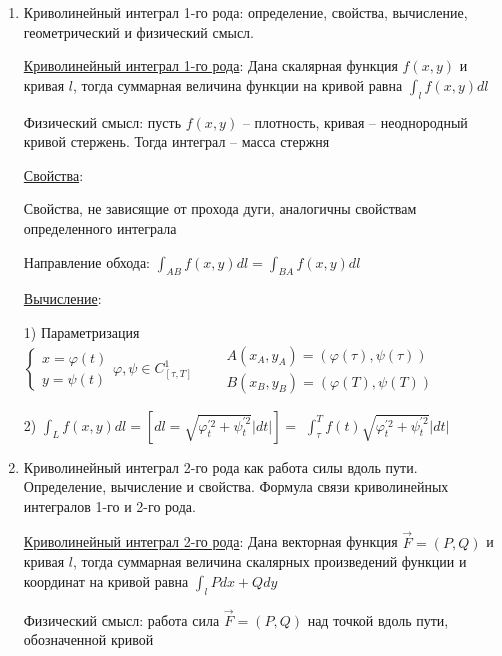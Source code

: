 \documentclass[12pt]{article}
\begin{document}
\begin{enumerate}
        \item Криволинейный интеграл 1-го рода: определение, свойства, вычисление, геометрический и физический смысл.

        \hyperlink{curvilinearintegraloffirstkind}{Криволинейный интеграл 1-го рода}: Дана скалярная функция $f(x, y)$ и кривая $l$, тогда суммарная величина функции на кривой равна $\int_l f(x, y) dl$

        Физический смысл: пусть $f(x, y)$ -- плотность, кривая -- неоднородный кривой стержень. Тогда интеграл -- масса стержня

        \hyperlink{curvilinearintegraloffirstkindproperties}{Свойства}:

        Свойства, не зависящие от прохода дуги, аналогичны свойствам определенного интеграла

        Направление обхода: $\int_{AB} f(x, y)dl = \int_{BA} f(x, y)dl$

        \hyperlink{curvilinearintegraloffirstkindcalculation}{Вычисление}:

        1) Параметризация $\begin{cases}
            x = \varphi(t) \\
            y = \psi(t)
        \end{cases} \varphi, \psi \in C^1_{[\tau, T]} \quad\quad \begin{matrix}
            A(x_A, y_A) = (\varphi(\tau), \psi(\tau)) \\
            B(x_B, y_B) = (\varphi(T), \psi(T))
        \end{matrix}$

        2) $\int_{L} f(x, y) dl = \left[dl = \sqrt{\varphi_t^{\prime 2} + \psi_t^{\prime 2}}|dt|\right] = $
        $\int_\tau^T f(t) \sqrt{\varphi_t^{\prime 2} + \psi_t^{\prime 2}}|dt|$

        \item Криволинейный интеграл 2-го рода как работа силы вдоль пути. Определение, вычисление и свойства. Формула связи криволинейных интегралов 1-го и 2-го рода.

        \hyperlink{curvilinearintegralofsecondkind}{Криволинейный интеграл 2-го рода}:
        Дана векторная функция $\overrightarrow{F} = (P, Q)$ и кривая $l$, тогда суммарная величина скалярных произведений функции и координат на кривой равна $\int_{l} Pdx + Qdy$

        Физический смысл: работа сила $\overrightarrow{F} = (P, Q)$ над точкой вдоль пути, обозначенной кривой


\end{enumerate}
\end{document}
